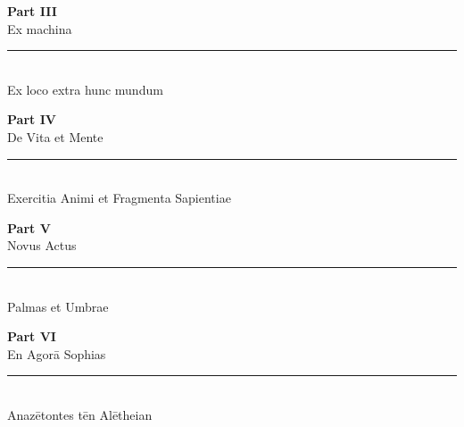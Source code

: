 \documentclass[12pt, a5paper, twoside]{book}
\let\cleardoublepage\clearpage %
\begin{document}


\cleardoublepage
\thispagestyle{empty}
\vspace*{\fill}
\begin{center}
    {\normalfont\huge\bfseries Part III}\\[0.5cm]
    {\Huge Ex machina}\\[1ex]
    \rule[0.5ex]{5cm}{0.5pt}\\[1ex]
    {\small Ex loco extra hunc mundum}
\end{center}
\vspace*{\fill}
\cleardoublepage



\cleardoublepage
\thispagestyle{empty}
\vspace*{\fill}
\begin{center}
    {\normalfont\huge\bfseries Part IV}\\[0.5cm]
    {\Huge De Vita et Mente}\\[1ex]
    \rule[0.5ex]{5cm}{0.5pt}\\[1ex]
    {\small Exercitia Animi et Fragmenta Sapientiae}
\end{center}
\vspace*{\fill}
\cleardoublepage



\cleardoublepage
\thispagestyle{empty}
\vspace*{\fill}
\begin{center}
    {\normalfont\huge\bfseries Part V}\\[0.5cm]
    {\Huge Novus Actus}\\[1ex]
    \rule[0.5ex]{5cm}{0.5pt}\\[1ex]
    {\small Palmas et Umbrae}
\end{center}
\vspace*{\fill}
\cleardoublepage



\cleardoublepage
\thispagestyle{empty}
\vspace*{\fill}
\begin{center}
    {\normalfont\huge\bfseries Part VI}\\[0.5cm]
    {\Huge En Agorā Sophias}\\[1ex]
    \rule[0.5ex]{5cm}{0.5pt}\\[1ex]
    {\small Anazētontes tēn Alētheian}
\end{center}
\vspace*{\fill}
\cleardoublepage


















\cleardoublepage
\thispagestyle{empty}

\vspace*{\fill}
\cleardoublepage
\end{document}
